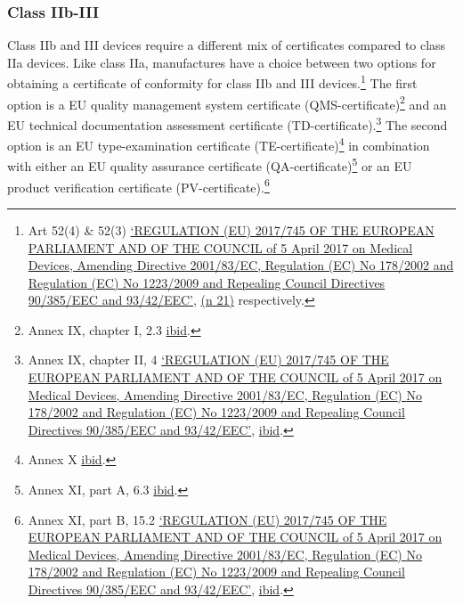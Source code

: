 \documentclass[
]{scrartcl}
\begin{document}
\hypertarget{class-iib-iii}{%
\subsubsection{Class IIb-III}\label{class-iib-iii}}

Class IIb and III devices require a different mix of certificates compared to class IIa devices. Like class IIa, manufactures have a choice between two options for obtaining a certificate of conformity for class IIb and III devices.\footnote{Art 52(4) \& 52(3) \protect\hyperlink{ref-REGULATIONEU2017a}{{`{REGULATION} ({EU}) 2017/745 {OF THE EUROPEAN PARLIAMENT AND OF THE COUNCIL} of 5 {April} 2017 on Medical Devices, Amending {Directive} 2001/83/{EC}, {Regulation} ({EC}) {No} 178/2002 and {Regulation} ({EC}) {No} 1223/2009 and Repealing {Council Directives} 90/385/{EEC} and 93/42/{EEC}'}}, \protect\hyperlink{ref-REGULATIONEU2017a}{(n 21)} respectively.} The first option is a EU quality management system certificate (QMS-certificate)\footnote{Annex IX, chapter I, 2.3 \protect\hyperlink{ref-REGULATIONEU2017a}{ibid}.} and an EU technical documentation assessment certificate (TD-certificate).\footnote{Annex IX, chapter II, 4 \protect\hyperlink{ref-REGULATIONEU2017a}{{`{REGULATION} ({EU}) 2017/745 {OF THE EUROPEAN PARLIAMENT AND OF THE COUNCIL} of 5 {April} 2017 on Medical Devices, Amending {Directive} 2001/83/{EC}, {Regulation} ({EC}) {No} 178/2002 and {Regulation} ({EC}) {No} 1223/2009 and Repealing {Council Directives} 90/385/{EEC} and 93/42/{EEC}'}}, \protect\hyperlink{ref-REGULATIONEU2017a}{ibid}.} The second option is an EU type-examination certificate (TE-certificate)\footnote{Annex X \protect\hyperlink{ref-REGULATIONEU2017a}{ibid}.} in combination with either an EU quality assurance certificate (QA-certificate)\footnote{Annex XI, part A, 6.3 \protect\hyperlink{ref-REGULATIONEU2017a}{ibid}.} or an EU product verification certificate (PV-certificate).\footnote{Annex XI, part B, 15.2 \protect\hyperlink{ref-REGULATIONEU2017a}{{`{REGULATION} ({EU}) 2017/745 {OF THE EUROPEAN PARLIAMENT AND OF THE COUNCIL} of 5 {April} 2017 on Medical Devices, Amending {Directive} 2001/83/{EC}, {Regulation} ({EC}) {No} 178/2002 and {Regulation} ({EC}) {No} 1223/2009 and Repealing {Council Directives} 90/385/{EEC} and 93/42/{EEC}'}}, \protect\hyperlink{ref-REGULATIONEU2017a}{ibid}.}
\end{document}
